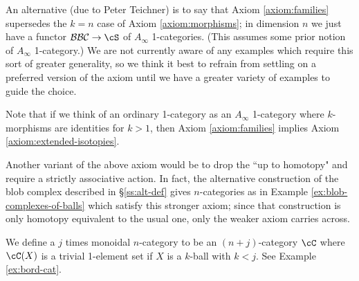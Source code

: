 An alternative (due to Peter Teichner) is to say that Axiom \ref{axiom:families} 
supersedes the $k=n$ case of Axiom \ref{axiom:morphisms}; in dimension $n$ we just have a
functor $\bbc \to \cS$ of $A_\infty$ 1-categories.
(This assumes some prior notion of $A_\infty$ 1-category.)
We are not currently aware of any examples which require this sort of greater generality, so we think it best
to refrain from settling on a preferred version of the axiom until
we have a greater variety of examples to guide the choice.

Note that if we think of an ordinary 1-category as an $A_\infty$ 1-category where $k$-morphisms are identities for $k>1$,
then Axiom \ref{axiom:families} implies Axiom \ref{axiom:extended-isotopies}.

Another variant of the above axiom would be to drop the ``up to homotopy" and require a strictly associative action. 
In fact, the alternative construction of the blob complex described in \S \ref{ss:alt-def} 
gives $n$-categories as in Example \ref{ex:blob-complexes-of-balls} which satisfy this stronger axiom; 
since that construction is only homotopy equivalent to the usual one, only the weaker axiom carries across.



\medskip

We define a $j$ times monoidal $n$-category to be an $(n{+}j)$-category $\cC$ where
$\cC(X)$ is a trivial 1-element set if $X$ is a $k$-ball with $k<j$.
See Example \ref{ex:bord-cat}.

\medskip


